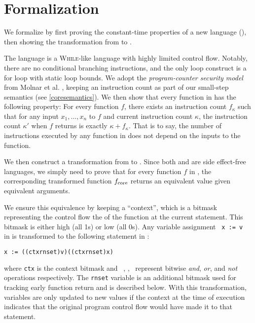 \section{Formalization}
\label{sec:formalization}

We formalize \constc by first proving the constant-time properties of a new
language (\ccore), then showing the transformation from \constc to \ccore.

The language \ccore is a \textsc{While}-like language with highly limited
control flow. Notably, there are no conditional branching instructions, and the
only loop construct is a for loop with static loop bounds. We adopt the
\emph{program-counter security model} from Molnar et al. \cite{pcsecmodel},
keeping an instruction count as part of our small-step semantics (see
\autoref{coresemantics}). We then show that every function in \ccore has the
following property: For every function $f$, there exists an instruction count
$f_\kappa$ such that for any input $x_1,\dots,x_n$ to $f$ and current
instruction count $\kappa$, the instruction count $\kappa'$ when $f$ returns is
exactly $\kappa + f_\kappa$. That is to say, the number of instructions executed
by any function in \ccore does not depend on the inputs to the function.

We then construct a transformation from \constc to \ccore. Since both \ccore and
\constc are side effect-free languages, we simply need to prove that for every
function $f$ in \constc, the corresponding transformed function
$f_{\textnormal{core}}$ returns an equivalent value given equivalent arguments.

We ensure this equivalence by keeping a ``context'', which is a bitmask
representing the control flow the of the function at the current statement. This
bitmask is either high (all 1s) or low (all 0s).  Any variable assignment
~\texttt{x := v}~ in \constc is transformed to the following statement in
\ccore:
\begin{center}
  \texttt{x := ((ctx\bandx rnset)\bandx v)\borx(\bnot (ctx\bandx rnset)\bandx x)}
\end{center}
where \texttt{ctx} is the context bitmask and ~\band, \bor, \bnot\ represent
bitwise \emph{and}, \emph{or}, and \emph{not} operations respectively. The
\texttt{rnset} variable is an additional bitmask used for tracking early
function return and is described below.  With this transformation, variables are
only updated to new values if the context at the time of execution indicates
that the original program control flow would have made it to that statement.

